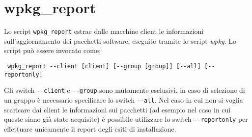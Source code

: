 \documentclass[a4paper,10pt,oneside]{memoir}
\begin{document}
\section*{wpkg\_report}

Lo script \verb#wpkg_report# estrae dalle macchine client le informazioni sull'aggiornamento dei pacchetti software, eseguito tramite lo script \emph{wpkg}. Lo script può essere invocato come:
\begin{verbatim}
 wpkg_report --client [client] [--group [group]] [--all] [--reportonly]
\end{verbatim}
Gli switch \verb#--client# e \verb#--group# sono mutamente esclusivi, in caso di selezione di un gruppo è necessario specificare lo switch \verb#--all#. Nel caso in cui non si voglia scaricare dai client le informazioni sui pacchetti (ad esempio nel caso in cui queste siano già state acquisite) è possibile utilizzare lo switch \verb#--reportonly# per effettuare unicamente il report degli esiti di installazione.
\end{document}
